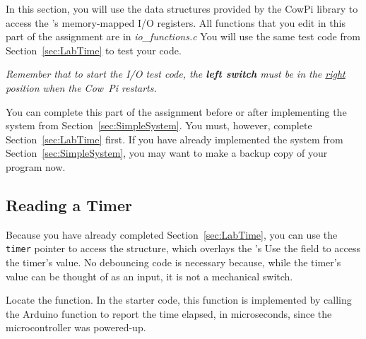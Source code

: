 In this section, you will use the data structures provided by the CowPi library to access the \processor's memory-mapped I/O registers.
All functions that you edit in this part of the assignment are in \textit{io\_functions.c}
You will use the same test code from Section~\ref{sec:LabTime} to test your code.

\textit{Remember that to start the I/O test code, the \textbf{left switch} must be in the \underline{right} position when the Cow~Pi restarts.}

You can complete this part of the assignment before or after implementing the system from Section~\ref{sec:SimpleSystem}.
You must, however, complete Section~\ref{sec:LabTime} first.
If you have already implemented the system from Section~\ref{sec:SimpleSystem}, you may want to make a backup copy of your program now.


\subsection{Reading a Timer} \label{subsec:timer}

Because you have already completed Section~\ref{sec:LabTime}, you can use the \lstinline{timer} pointer to access the
structure, which overlays the \processor's
Use the
field to access the
timer's value.
No debouncing code is necessary because, while the timer's value can be thought of as an input, it is not a mechanical switch.

Locate the  function.
In the starter code, this function is implemented by calling the Arduino  function to report the time elapsed, in microseconds, since the microcontroller was powered-up.

